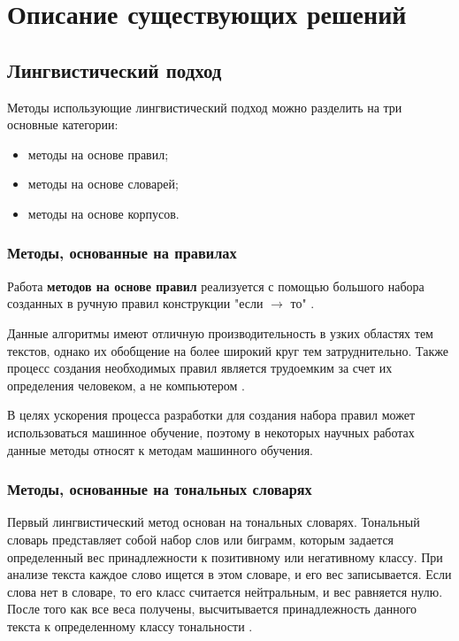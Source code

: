 \chapter{Описание существующих решений}

\section{Лингвистический подход}

Методы использующие лингвистический подход можно разделить на три основные
категории:
\begin{itemize}
    \item методы на основе правил;
    \item методы на основе словарей;
    \item методы на основе корпусов.
\end{itemize}

\subsection{Методы, основанные на правилах}

Работа \textbf{методов на основе правил} реализуется с помощью большого набора
созданных в ручную правил конструкции "если $\rightarrow$ то" \cite{article14}.

Данные алгоритмы имеют отличную производительность в узких
областях тем текстов, однако их обобщение на более широкий круг тем
затруднительно. Также процесс создания необходимых правил является
трудоемким за счет их определения человеком, а не компьютером \cite{article15}.

В целях ускорения процесса разработки для создания набора правил может
использоваться машинное обучение, поэтому в некоторых научных работах
\cite{article16} \cite{article17} данные методы относят к методам машинного
обучения.

\subsection{Методы, основанные на тональных словарях}

Первый лингвистический метод основан на тональных словарях. Тональный словарь
представляет собой набор слов или биграмм, которым задается определенный вес
принадлежности к позитивному или негативному классу. При анализе текста каждое
слово ищется в этом словаре, и его вес записывается. Если слова нет в словаре,
то его класс считается нейтральным, и вес равняется нулю. После того как все
веса получены, высчитывается принадлежность данного текста к определенному
классу тональности \cite{article14}.

